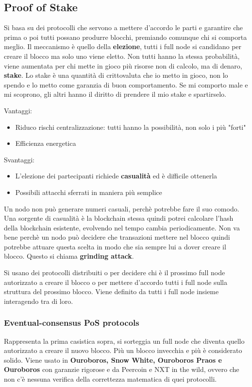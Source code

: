 \subsection{Proof of Stake}
Si basa su dei protocolli che servono a mettere d'accordo le parti e garantire che prima o poi tutti possano produrre blocchi, premiando comunque chi si comporta meglio. Il meccanismo è quello della \textbf{elezione}, tutti i full node si candidano per creare il blocco ma solo uno viene eletto. Non tutti hanno la stessa probabilità, viene aumentata per chi mette in gioco più risorse non di calcolo, ma di denaro, \textbf{stake}. Lo stake è una quantità di crittovaluta che io metto in gioco, non lo spendo e lo metto come garanzia di buon comportamento. Se mi comporto male e mi scoprono, gli altri hanno il diritto di prendere il mio stake e spartirselo. 

Vantaggi:
\begin{itemize}
    \item Riduco rischi centralizzazione: tutti hanno la possibilità, non solo i più "forti"
    \item Efficienza energetica
\end{itemize}
Svantaggi:
\begin{itemize}
    \item L'elezione dei partecipanti richiede \textbf{casualità} ed è difficile ottenerla
    \item Possibili attacchi sferrati in maniera più semplice
\end{itemize}


Un nodo non può generare numeri casuali, perchè potrebbe fare il suo comodo. Una sorgente di casualità è la blockchain stessa quindi potrei calcolare l'hash della blockchain esistente, evolvendo nel tempo cambia periodicamente. Non va bene perchè un nodo può decidere che transazioni mettere nel blocco quindi potrebbe attuare questa scelta in modo che sia sempre lui a dover creare il blocco. Questo si chiama \textbf{grinding attack}. 

Si usano dei protocolli distribuiti o per decidere chi è il prossimo full node autorizzato a creare il blocco o per mettere d'accordo tutti i full node sulla struttura del prossimo blocco. Viene definito da tutti i full node insieme interagendo tra di loro.

\subsubsection{Eventual-consensus PoS protocols}
Rappresenta la prima casistica sopra, si sorteggia un full node che diventa quello autorizzato a creare il nuovo blocco. Più un blocco invecchia e più è considerato solido. Viene usato in \textbf{Ouroboros, Snow White, Ouroboros Praos e Ouroboros } con garanzie rigorose e da Peercoin e NXT in the wild, ovvero che non c'è nessuna verifica della correttezza matematica di quei protocolli.

